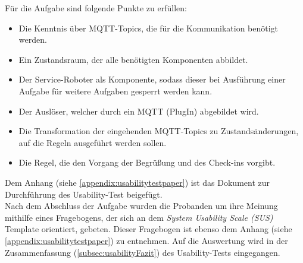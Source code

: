         Für die Aufgabe sind folgende Punkte zu erfüllen:
        \begin{itemize}
            \item Die Kenntnis über \acs{MQTT}-Topics, die für die Kommunikation benötigt werden.
            \item Ein Zustandsraum, der alle benötigten Komponenten abbildet.
            \item Der Service-Roboter als Komponente, sodass dieser bei Ausführung einer Aufgabe für weitere Aufgaben gesperrt werden kann. 
            \item Der Auslöser, welcher durch ein \acs{MQTT} (PlugIn) abgebildet wird.
            \item Die Transformation der eingehenden \acs{MQTT}-Topics zu Zustandsänderungen, auf die Regeln ausgeführt werden sollen.
            \item Die Regel, die den Vorgang der Begrüßung und des Check-ins vorgibt.
        \end{itemize}
        Dem Anhang (siehe \ref{appendix:usabilitytestpaper}) ist das Dokument zur Durchführung des Usability-Test beigefügt. 
        \\
        \linebreak
        Nach dem Abschluss der Aufgabe wurden die Probanden um ihre Meinung mithilfe eines Fragebogens, der sich an dem \textit{System Usability Scale (SUS)} 
        Template orientiert, gebeten. Dieser Fragebogen ist ebenso dem Anhang (siehe \ref{appendix:usabilitytestpaper}) zu entnehmen. Auf die Auswertung wird in der 
        Zusammenfassung (\ref{subsec:usabilityFazit}) des Usability-Tests eingegangen. 

